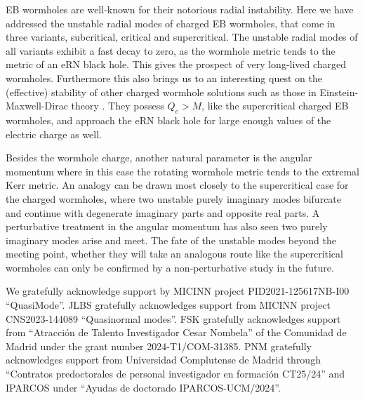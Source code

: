 \documentclass[floats,floatfix,showpacs,amssymb,prd,superscriptaddress,nofootinbib,nolongbibliography,reprint]{revtex4-2}
\newcommand\prlsec[1]{\vspace{2mm}\noindent {\textbf{  \textit{#1}}}}
\begin{document}
\prlsec{Conclusions.}
EB wormholes are well-known for their notorious radial instability.
Here we have addressed the unstable radial modes of charged EB wormholes, that come in three variants, subcritical, critical and supercritical.
The unstable radial modes of all variants exhibit a fast decay to zero, as the wormhole metric tends to the metric of an eRN black hole.
This gives the prospect of very long-lived charged wormholes.
Furthermore this also brings us to an interesting quest on the (effective) stability of other charged wormhole solutions such as those in Einstein-Maxwell-Dirac theory \cite{Blazquez-Salcedo:2020czn,Konoplya:2021hsm,Blazquez-Salcedo:2021udn}. 
They possess $Q_e>M$, like the supercritical charged EB wormholes, and approach the eRN black hole for large enough values of the electric charge as well.

Besides the wormhole charge, another natural parameter is the angular momentum where in this case the rotating wormhole metric tends to the extremal Kerr metric.
An analogy can be drawn most closely to the
supercritical case for the charged wormholes, where two unstable purely imaginary modes bifurcate and continue with degenerate imaginary parts and opposite real parts.
A perturbative treatment in the angular momentum has also seen two purely imaginary modes arise and meet. The fate of the unstable modes beyond the meeting point, whether they will take an analogous route like the supercritical wormholes can only be confirmed by a non-perturbative study in the future.






\prlsec{Acknowledgment.}
%
We gratefully acknowledge support by MICINN project PID2021-125617NB-I00 ``QuasiMode''.
JLBS gratefully acknowledges support from MICINN project CNS2023-144089 ``Quasinormal modes''.
FSK gratefully acknowledges support from ``Atracci\'on de Talento Investigador Cesar Nombela'' of the Comunidad de Madrid under the grant number 2024-T1/COM-31385.
PNM gratefully acknowledges support from Universidad Complutense de Madrid through ``Contratos predoctorales
de personal investigador en formación CT25/24'' and IPARCOS under ``Ayudas de doctorado IPARCOS-UCM/2024''.
\end{document}
